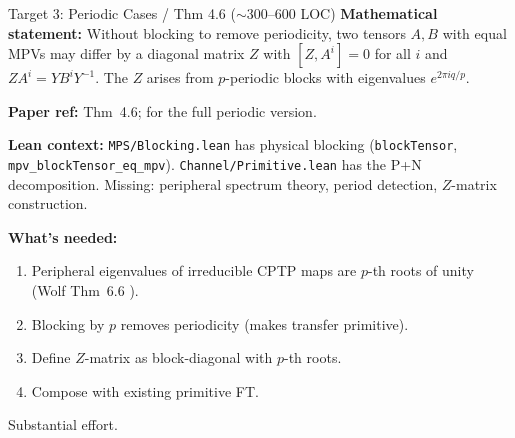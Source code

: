 \documentclass[aspectratio=169,10pt]{beamer}
\begin{document}
\begin{frame}{Target 3: Periodic Cases / Thm 4.6 (\texorpdfstring{$\sim$300--600}{~300-600} LOC)}
    \small
    \textbf{Mathematical statement:}
    Without blocking to remove periodicity, two tensors $A, B$ with equal MPVs may differ by
    a diagonal matrix $Z$ with $[Z, A^i] = 0$ for all $i$ and $ZA^i = YB^i Y^{-1}$.
    The $Z$ arises from $p$-periodic blocks with eigenvalues $e^{2\pi iq/p}$.

    \vspace{0.3em}
    \textbf{Paper ref:} \cite{Cirac2021Matrix} Thm~4.6; \cite{Cirac2017Irreducible} for the full periodic version.

    \vspace{0.3em}
    \textbf{Lean context:}
    \texttt{MPS/Blocking.lean} has physical blocking (\texttt{blockTensor}, \texttt{mpv\_blockTensor\_eq\_mpv}).
    \texttt{Channel/Primitive.lean} has the P+N decomposition.
    Missing: peripheral spectrum theory, period detection, $Z$-matrix construction.

    \vspace{0.3em}
    \textbf{What's needed:}
    \begin{enumerate}
        \item Peripheral eigenvalues of irreducible CPTP maps are $p$-th roots of unity (Wolf Thm~6.6 \cite{Wolf2012Quantum}).
        \item Blocking by $p$ removes periodicity (makes transfer primitive).
        \item Define $Z$-matrix as block-diagonal with $p$-th roots.
        \item Compose with existing primitive FT.
    \end{enumerate}
    \textcolor{softred}{Substantial effort.}
\end{frame}
\end{document}
